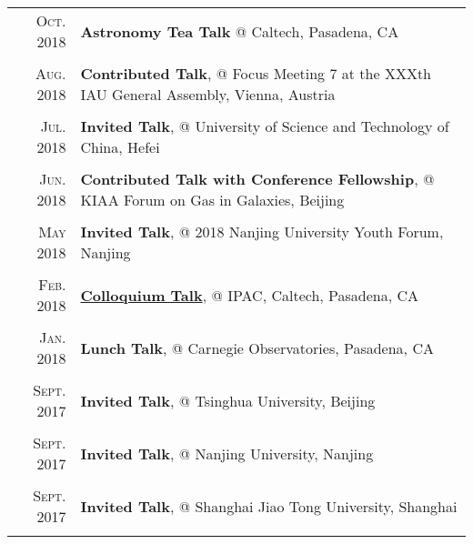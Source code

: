 \documentclass[letterpaper,10pt]{article}
\newcommand{\textwrap}{5.8in}       %
\begin{document}
\begin{longtable}{r|p{\textwrap}}
    \textsc{Oct. 2018}   &   \textbf{Astronomy Tea Talk} @ Caltech, Pasadena, CA \\
    \multicolumn{2}{c}{} \\

    \textsc{Aug. 2018}   &   \textbf{Contributed Talk}, @ Focus Meeting 7 at the XXXth IAU General Assembly, Vienna, Austria \\
    \multicolumn{2}{c}{} \\

    \textsc{Jul. 2018}   &   \textbf{Invited Talk}, @ University of Science and Technology of China, Hefei \\
    \multicolumn{2}{c}{} \\

    \textsc{Jun. 2018}   &   \textbf{Contributed Talk with Conference Fellowship}, @ KIAA Forum on Gas in Galaxies, Beijing \\
    \multicolumn{2}{c}{} \\

    \textsc{May 2018}   &   \textbf{Invited Talk}, @ 2018 Nanjing University Youth Forum, Nanjing \\
    \multicolumn{2}{c}{} \\

    \textsc{Feb. 2018}   &   \href{https://www.ipac.caltech.edu/event/358}{\textbf{Colloquium Talk}}, @ IPAC, Caltech, Pasadena, CA \\
    \multicolumn{2}{c}{} \\

    \textsc{Jan. 2018}   &   \textbf{Lunch Talk}, @ Carnegie Observatories, Pasadena, CA \\
    \multicolumn{2}{c}{} \\

    \textsc{Sept. 2017}   &   \textbf{Invited Talk}, @ Tsinghua University, Beijing \\
    \multicolumn{2}{c}{} \\

    \textsc{Sept. 2017}   &   \textbf{Invited Talk}, @ Nanjing University, Nanjing \\
    \multicolumn{2}{c}{} \\

    \textsc{Sept. 2017}   &   \textbf{Invited Talk}, @ Shanghai Jiao Tong University, Shanghai \\
    \multicolumn{2}{c}{} \\



\end{longtable}
\end{document}
